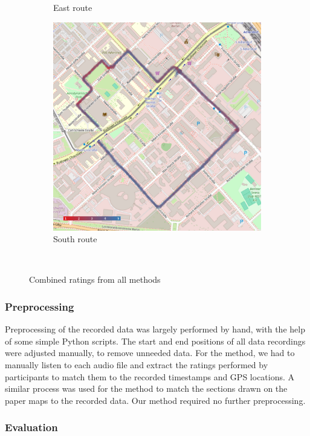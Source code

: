 \begin{figure}[!htb]
\begin{subfigure}{.3333\textwidth}
        \caption{East route}
        \label{fig:ratings_east_route}
    \end{subfigure}%
    \begin{subfigure}{.3333\textwidth}
        \centering
        \includegraphics[width=.9\linewidth]{images/ratings_south_route.jpg}
        \caption{South route}
        \label{fig:ratings_south_route}
    \end{subfigure}\
    \caption{Combined ratings from all methods}
    \label{fig:route_ratings}
\end{figure}

\subsubsection{Preprocessing}\label{subsec:preprocessing}

Preprocessing of the recorded data was largely performed by hand, with the help of some simple Python scripts.
The start and end positions of all data recordings were adjusted manually, to remove unneeded data.
For the \audiorecording method, we had to manually listen to each audio file and extract the ratings performed by participants to match them to the recorded timestamps and GPS locations.
A similar process was used for the \mapping method to match the sections drawn on the paper maps to the recorded data.
Our \likertshift method required no further preprocessing.

\subsubsection{Evaluation}

